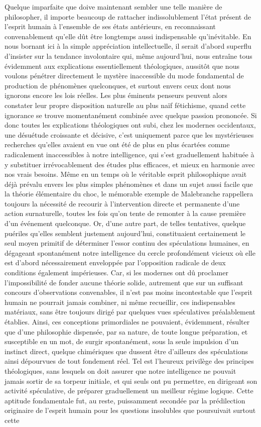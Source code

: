 \documentclass[french,twoside]{book} %
\begin{document}
Quelque imparfaite que doive maintenant sembler une telle manière de philosopher, il importe beaucoup de rattacher indissolublement l’état présent de l’esprit humain à l’ensemble de ses états antérieurs, en reconnaissant convenablement qu’elle dût être longtemps aussi indispensable qu’inévitable. En nous bornant ici à la simple appréciation intellectuelle, il serait d’abord superflu d’insister sur la tendance involontaire qui, même aujourd’hui, nous entraîne tous évidemment aux explications essentiellement théologiques, aussitôt que nous voulons pénétrer directement le mystère inaccessible du mode fondamental de production de phénomènes quelconques, et surtout envers ceux dont nous ignorons encore les lois réelles. Les plus éminents penseurs peuvent alors constater leur propre disposition naturelle au plus naïf fétichisme, quand cette ignorance se trouve momentanément combinée avec quelque passion prononcée. Si donc toutes les explications théologiques ont subi, chez les modernes occidentaux, une désuétude croissante et décisive, c’est uniquement parce que les mystérieuses recherches qu’elles avaient en vue ont été de plus en plus écartées comme radicalement inaccessibles à notre intelligence, qui s’est graduellement habituée à y substituer irrévocablement des études plus efficaces, et mieux en harmonie avec nos vrais besoins. Même en un temps où le véritable esprit philosophique avait déjà prévalu envers les plus simples phénomènes et dans un sujet aussi facile que la théorie élémentaire du choc, le mémorable exemple de Malebranche rappellera toujours la nécessité de recourir à l’intervention directe et permanente d’une action surnaturelle, toutes les fois qu’on tente de remonter à la cause première d’un événement quelconque. Or, d’une autre part, de telles tentatives, quelque puériles qu’elles semblent justement aujourd’hui, constituaient certainement le seul moyen primitif de déterminer l’essor continu des spéculations humaines, en dégageant spontanément notre intelligence du cercle profondément vicieux où elle est d’abord nécessairement enveloppée par l’opposition radicale de deux conditions également impérieuses. Car, si les modernes ont dû proclamer l’impossibilité de fonder aucune théorie solide, autrement que sur un suffisant concours d’observations convenables, il n’est pas moins incontestable que l’esprit humain ne pourrait jamais combiner, ni même recueillir, ces indispensables matériaux, sans être toujours dirigé par quelques vues spéculatives préalablement établies. Ainsi, ces conceptions primordiales ne pouvaient, évidemment, résulter que d’une philosophie dispensée, par sa nature, de toute longue préparation, et susceptible en un mot, de surgir spontanément, sous la seule impulsion d’un instinct direct, quelque chimériques que dussent être d’ailleurs des spéculations ainsi dépourvues de tout fondement réel. Tel est l’heureux privilège des principes théologiques, sans lesquels on doit assurer que notre intelligence ne pouvait jamais sortir de sa torpeur initiale, et qui seuls ont pu permettre, en dirigeant son activité spéculative, de préparer graduellement un meilleur régime logique. Cette aptitude fondamentale fut, au reste, puissamment secondée par la prédilection originaire de l’esprit humain pour les questions insolubles que poursuivait surtout cette 
\end{document}

